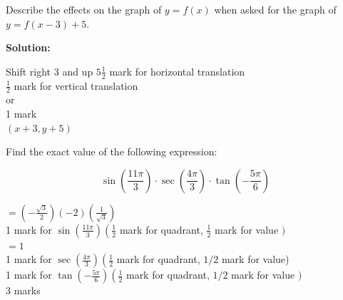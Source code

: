 \documentclass[12pt,addpoints,answers]{exam}
\begin{document}
\begin{questions}
Describe the effects on the graph of $y=f(x)$ when asked for the graph of $y=f(x-3)+5$.
\begin{solution}
\textbf{Solution:}\par
Shift right 3 and up $5 \frac{1}{2}$ mark for horizontal translation\\
$\frac{1}{2}$ mark for vertical translation\\
or\\
1 mark\\
$(x+3, y+5)$

Find the exact value of the following expression:

$$
\sin \left(\frac{11 \pi}{3}\right) \cdot \sec \left(\frac{4 \pi}{3}\right) \cdot \tan \left(-\frac{5 \pi}{6}\right)
$$

$=\left(-\frac{\sqrt{3}}{2}\right)(-2)\left(\frac{1}{\sqrt{3}}\right)$\\
1 mark for $\sin \left(\frac{11 \pi}{3}\right)\left(\frac{1}{2}\right.$ mark for quadrant, $\frac{1}{2}$ mark for value $)$\\
$=1$\\
1 mark for $\sec \left(\frac{4 \pi}{3}\right)\left(\frac{1}{2}\right.$ mark for quadrant, $1 / 2$ mark for value)\\
1 mark for $\tan \left(-\frac{5 \pi}{6}\right)\left(\frac{1}{2}\right.$ mark for quadrant, $1 / 2$ mark for value $)$\\
3 marks
\end{solution}

\end{questions}
\end{document}
